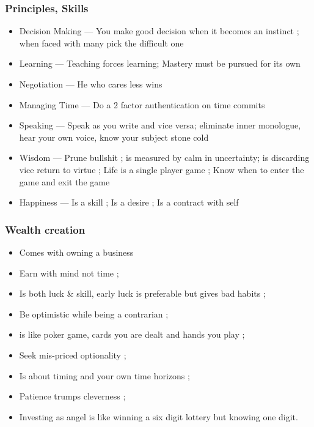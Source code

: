 \begin{frame}[fragile]\frametitle{Principles, Skills}

\begin{itemize}
\item Decision Making — You make good decision when it becomes an instinct ; when
faced with many pick the difficult one
\item Learning — Teaching forces learning; Mastery must be pursued for its own
\item Negotiation — He who cares less wins
\item Managing Time — Do a 2 factor authentication on time commits
\item Speaking — Speak as you write and vice versa; eliminate inner monologue, hear your
own voice, know your subject stone cold
\item Wisdom — Prune bullshit ; is measured by calm in uncertainty; is discarding vice
return to virtue ; Life is a single player game ; Know when to enter the game and exit
the game
\item Happiness — Is a skill ; Is a desire ; Is a contract with self
\end{itemize}

\end{frame}


\begin{frame}[fragile]\frametitle{ Wealth creation}

\begin{itemize}
\item Comes with owning a business
\item Earn with mind not time ;
\item Is both luck \& skill, early luck is preferable but gives bad habits ;
\item Be optimistic while being a contrarian ;
\item is like poker game, cards you are dealt and hands you play ;
\item Seek mis-priced optionality ;
\item Is about timing and your own time horizons ;
\item Patience trumps cleverness ;
\item Investing as angel is like winning a six digit lottery but knowing one digit.
\end{itemize}

\end{frame}

